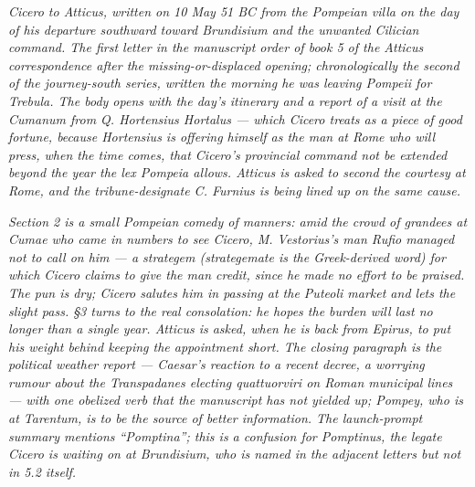 
\textit{Cicero to Atticus, written on 10 May 51 BC from the Pompeian
villa on the day of his departure southward toward Brundisium
and the unwanted Cilician command. The first letter in the
manuscript order of book 5 of the Atticus correspondence after
the missing-or-displaced opening; chronologically the second of
the journey-south series, written the morning he was leaving
Pompeii for Trebula. The body opens with the day's itinerary
and a report of a visit at the Cumanum from Q. Hortensius
Hortalus --- which Cicero treats as a piece of good fortune,
because Hortensius is offering himself as the man at Rome who
will press, when the time comes, that Cicero's provincial
command not be extended beyond the year the \textit{lex Pompeia}
allows. Atticus is asked to second the courtesy at Rome, and
the tribune-designate C. Furnius is being lined up on the same
cause.}

\textit{Section 2 is a small Pompeian comedy of manners: amid the
crowd of grandees at Cumae who came in numbers to see Cicero,
M. Vestorius's man Rufio managed not to call on him --- a
strategem (\textit{strategemate} is the Greek-derived word) for
which Cicero claims to give the man credit, since he made no
effort to be praised. The pun is dry; Cicero salutes him in
passing at the Puteoli market and lets the slight pass. \S 3
turns to the real consolation: he hopes the burden will last
no longer than a single year. Atticus is asked, when he is back
from Epirus, to put his weight behind keeping the appointment
short. The closing paragraph is the political weather report ---
Caesar's reaction to a recent decree, a worrying rumour about
the Transpadanes electing \textit{quattuorviri} on Roman
municipal lines --- with one obelized verb that the manuscript
has not yielded up; Pompey, who is at Tarentum, is to be the
source of better information. The launch-prompt summary
mentions ``Pomptina''; this is a confusion for Pomptinus, the
legate Cicero is waiting on at Brundisium, who is named in the
adjacent letters but not in 5.2 itself.}
